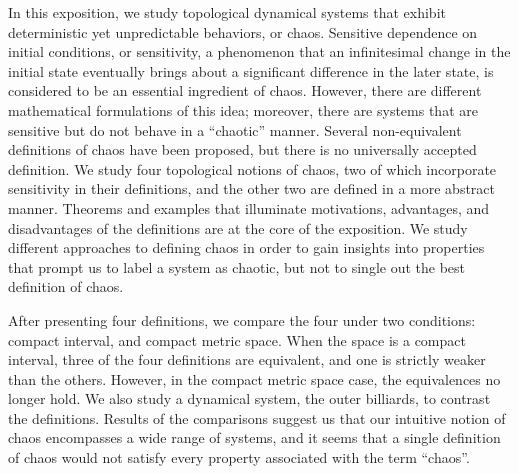 \documentclass[10pt,twoside,draft]{book}
\begin{document}
In this exposition, we study topological dynamical systems that exhibit deterministic yet unpredictable behaviors, or chaos.
Sensitive dependence on initial conditions, or sensitivity, a phenomenon that an infinitesimal change in the initial state eventually brings about a significant difference in the later state, is considered to be an essential ingredient of chaos. 
However, there are different mathematical formulations of this idea; moreover, there are systems that are sensitive but do not behave in a ``chaotic'' manner.
Several non-equivalent definitions of chaos have been proposed, but there is no universally accepted definition.
We study four topological notions of chaos, two of which incorporate sensitivity in their definitions, and the other two are defined in a more abstract manner. %
Theorems and examples that illuminate motivations, advantages, and disadvantages of the definitions are at the core of the exposition.
We study different approaches to defining chaos in order to gain insights into properties that prompt us to label a system as chaotic, but not to single out the best definition of chaos.

After presenting four definitions, we compare the four under two conditions: compact interval, and compact metric space.
When the space is a compact interval, three of the four definitions are equivalent, and one is strictly weaker than the others.
However, in the compact metric space case, the equivalences no longer hold.
We also study a dynamical system, the outer billiards, to contrast the definitions. %
Results of the comparisons suggest us that our intuitive notion of chaos encompasses a wide range of systems, and it seems that a single definition of chaos would not satisfy every property associated with the term ``chaos''.



\end{document}
